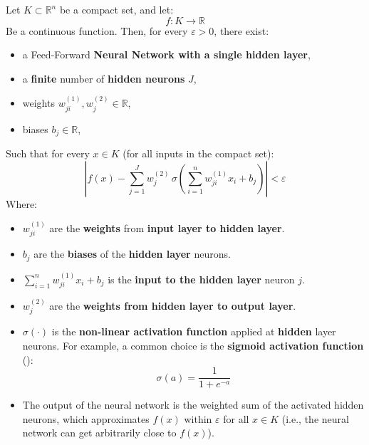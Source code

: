 \begin{theorem}
    Let $K \subset \mathbb{R}^n$ be a compact set, and let:
    \begin{equation*}
        f : K \to \mathbb{R}
    \end{equation*}
    Be a continuous function. Then, for every $\varepsilon > 0$, there exist:
    \begin{itemize}
        \item a Feed-Forward \textbf{Neural Network with a single hidden layer},
        \item a \textbf{finite} number of \textbf{hidden neurons} $J$,
        \item weights $w_{ji}^{(1)}, w_j^{(2)} \in \mathbb{R}$,
        \item biases $b_j \in \mathbb{R}$,
    \end{itemize}
    Such that for every $x \in K$ (for all inputs in the compact set):
    \begin{equation}
        \left|
            f(x) -
            \displaystyle\sum_{j=1}^{J}
            w_j^{(2)}
            \, \sigma\!\left(
                \sum_{i=1}^{n} w_{ji}^{(1)} x_i + b_j
            \right)
        \right| < \varepsilon
    \end{equation}
    Where:
    \begin{itemize}
        \item $w_{ji}^{(1)}$ are the \textbf{weights} from \textbf{input layer to hidden layer}.
        \item $b_j$ are the \textbf{biases} of the \textbf{hidden layer} neurons.
        \item $\sum_{i=1}^{n} w_{ji}^{(1)} x_i + b_j$ is the \textbf{input to the hidden layer} neuron $j$.
        \item $w_j^{(2)}$ are the \textbf{weights from hidden layer to output layer}.
        \item $\sigma(\cdot)$ is the \textbf{non-linear activation function} applied at \textbf{hidden} layer neurons. For example, a common choice is the \textbf{sigmoid activation function} ():
        \begin{equation*}
            \sigma(a) = \dfrac{1}{1 + e^{-a}}
        \end{equation*}
        \item The output of the neural network is the weighted sum of the activated hidden neurons, which approximates $f(x)$ within $\varepsilon$ for all $x \in K$ (i.e., the neural network can get arbitrarily close to $f(x)$).
    \end{itemize}
\end{theorem}

